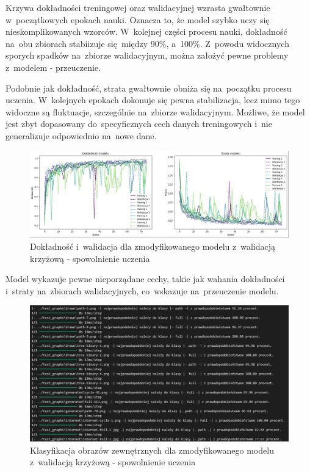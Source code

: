 Krzywa dokładności treningowej oraz walidacyjnej wzrasta gwałtownie w~początkowych epokach nauki.
Oznacza to, że model szybko uczy się nieskomplikowanych wzorców.
W~kolejnej części procesu nauki, dokładność na~obu zbiorach stabiizuje się~między 90\%, a~100\%.
Z~powodu widocznych sporych spadków na~zbiorze walidacyjnym, można założyć pewne problemy z~modelem - przeuczenie.

Podobnie jak dokładność, strata gwałtownie obniża się na~początku procesu uczenia.
W~kolejnych epokach dokonuje się pewna stabilizacja, lecz mimo tego widoczne są fluktuacje, szczególnie na~zbiorze walidacyjnym.
Możliwe, że model jest zbyt dopasowany do~specyficznych cech danych treningowych i~nie generalizuje odpowiednio na~nowe dane.

\begin{figure}[ht]
	\centering
	\includegraphics[width=15.5cm]{resources/tests/images/v4/crossvalid_4_img.png}
	\caption{Dokładność i~walidacja dla zmodyfikowanego modelu z~walidacją \\ krzyżową - spowolnienie uczenia}
	\label{Fig:tests-cv-4a}
\end{figure}
\FloatBarrier

Model wykazuje pewne nieporządane cechy, takie jak wahania dokładności i~straty na~zbiorach walidacyjnych,
co~wskazuje na~przeuczenie modelu.

\begin{figure}[ht]
	\centering
	\includegraphics[width=15.5cm]{resources/tests/images/v4/crossvalid_4_txt.png}
	\caption{Klasyfikacja obrazów zewnętrznych dla zmodyfikowanego modelu \\ z~walidacją krzyżową - spowolnienie uczenia}
	\label{Fig:tests-cv-4b}
\end{figure}
\FloatBarrier

